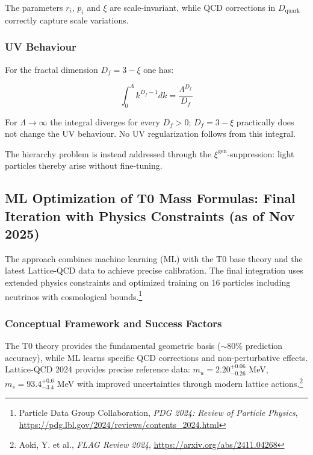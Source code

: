 	The parameters $r_i$, $p_i$ and $\xi$ are scale-invariant, while QCD corrections in $D_{\text{quark}}$ correctly capture scale variations.
	
	\subsubsection{UV Behaviour}

	For the fractal dimension $D_f = 3 - \xi$ one has:
	
	\begin{equation}
		\int_0^\Lambda k^{D_f-1} dk = \frac{\Lambda^{D_f}}{D_f}
	\end{equation}

	For $\Lambda \to \infty$ the integral diverges for every $D_f > 0$; $D_f = 3 - \xi$ practically does not change the UV behaviour. No UV regularization follows from this integral.

	The hierarchy problem is instead addressed through the $\xi^{\text{gen}}$-suppression: light particles thereby arise without fine-tuning.
	
	\subsection{ML Optimization of T0 Mass Formulas: Final Iteration with Physics Constraints (as of Nov 2025)}
	\label{sec:ml-optimization}
	
	The approach combines machine learning (ML) with the T0 base theory and the latest Lattice-QCD data to achieve precise calibration. The final integration uses extended physics constraints and optimized training on 16 particles including neutrinos with cosmological bounds.\footnote{Particle Data Group Collaboration, \emph{PDG 2024: Review of Particle Physics}, \url{https://pdg.lbl.gov/2024/reviews/contents\_2024.html}}
	
	\subsubsection{Conceptual Framework and Success Factors}
	
	The T0 theory provides the fundamental geometric basis ($\sim$80\% prediction accuracy), while ML learns specific QCD corrections and non-perturbative effects. Lattice-QCD 2024 provides precise reference data: $m_u=2.20^{+0.06}_{-0.26}$ MeV, $m_s=93.4^{+0.6}_{-3.4}$ MeV with improved uncertainties through modern lattice actions.\footnote{Aoki, Y. et al., \emph{FLAG Review 2024}, \url{https://arxiv.org/abs/2411.04268}}
	
